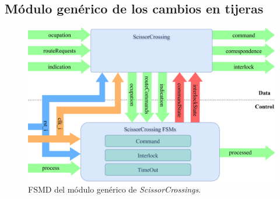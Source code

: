 \subsection{Módulo genérico de los cambios en tijeras}

\lipsum[1]

\begin{figure}[H]
	\centering
	\includegraphics[width=1\textwidth]{Figuras/SCR_module}
	\centering\caption{FSMD del módulo genérico de \textit{ScissorCrossings}.}
	\label{fig:SCR_module}
\end{figure}

\lipsum[1]